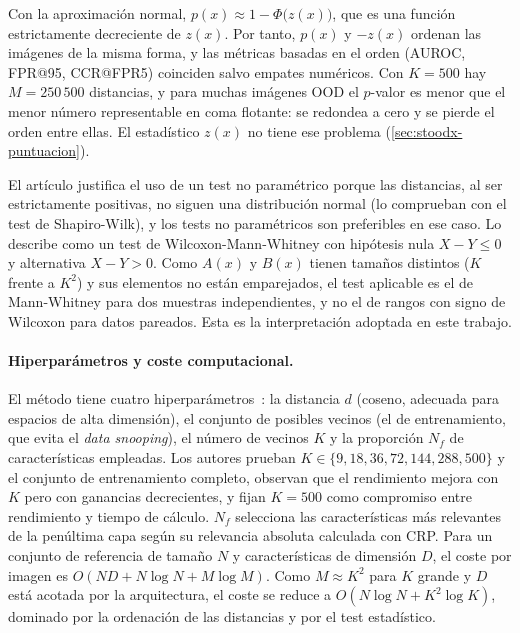 \begin{observacion}\label{obs:stoodx-z}
Con la aproximación normal, $p(x) \approx 1 - \Phi\bigl(z(x)\bigr)$, que es una función
estrictamente decreciente de $z(x)$. Por tanto, $p(x)$ y $-z(x)$ ordenan las imágenes de la
misma forma, y las métricas basadas en el orden (AUROC, FPR@95, CCR@FPR5) coinciden salvo
empates numéricos. Con $K = 500$ hay $M = 250\,500$ distancias, y para muchas imágenes OOD el
$p$-valor es menor que el menor número representable en coma flotante: se redondea a cero y
se pierde el orden entre ellas. El estadístico $z(x)$ no tiene ese problema
(\cref{sec:stoodx-puntuacion}).
\end{observacion}

\begin{observacion}\label{obs:stoodx-test}
El artículo justifica el uso de un test no paramétrico porque las distancias, al ser
estrictamente positivas, no siguen una distribución normal (lo comprueban con el test de
Shapiro-Wilk), y los tests no paramétricos son preferibles en ese caso. Lo describe como un
test de Wilcoxon-Mann-Whitney con hipótesis nula $X - Y \leq 0$ y alternativa $X - Y > 0$. Como
$A(x)$ y $B(x)$ tienen tamaños distintos ($K$ frente a $K^2$) y sus elementos no están
emparejados, el test aplicable es el de Mann-Whitney para dos muestras independientes, y no
el de rangos con signo de Wilcoxon para datos pareados. Esta es la interpretación adoptada
en este trabajo.
\end{observacion}

\paragraph{Hiperparámetros y coste computacional.}
El método tiene cuatro hiperparámetros~\cite{sevillano2026}: la distancia $d$ (coseno, adecuada
para espacios de alta dimensión), el conjunto de posibles vecinos (el de entrenamiento, que
evita el \emph{data snooping}), el número de vecinos $K$ y la proporción $N_f$ de
características empleadas. Los autores prueban $K \in \{9, 18, 36, 72, 144, 288, 500\}$ y el
conjunto de entrenamiento completo, observan que el rendimiento mejora con $K$ pero con
ganancias decrecientes, y fijan $K = 500$ como compromiso entre rendimiento y tiempo de
cálculo. $N_f$ selecciona las características más relevantes de la penúltima capa según su
relevancia absoluta calculada con CRP. Para un conjunto de referencia de tamaño $N$ y
características de dimensión $D$, el coste por imagen es
$O(N D + N \log N + M \log M)$. Como $M \approx K^2$ para $K$ grande y $D$ está acotada por la
arquitectura, el coste se reduce a $O(N \log N + K^2 \log K)$, dominado por la ordenación de
las distancias y por el test estadístico.

